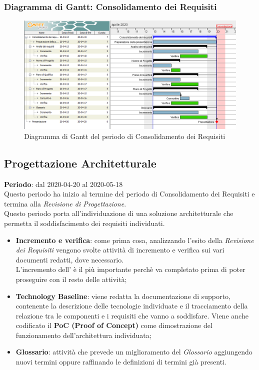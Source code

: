 	\subsubsection{Diagramma di Gantt: Consolidamento dei Requisiti}
		\begin{figure}[h]
			\centering
			\includegraphics[width=1.1\textwidth]{./res/img/DiagrammiGantt/cons_req_gantt.png}
			\caption{Diagramma di Gantt del periodo di Consolidamento dei Requisiti}
		\end{figure}
\newpage
\subsection{Progettazione Architetturale}
\textbf{Periodo}: dal 2020-04-20 al 2020-05-18 \\
Questo periodo ha inizio al termine del periodo di Consolidamento dei Requisiti e termina alla \textit{Revisione di Progettazione}. \\
Questo periodo porta all'individuazione di una soluzione architetturale che permetta il soddisfacimento dei requisiti individuati.
\begin{itemize}
	\item \textbf{Incremento e verifica}: come prima cosa, analizzando l'esito della \textit{Revisione dei Requisiti} vengono svolte attività di incremento e verifica sui vari documenti redatti, dove necessario. \\
	L'incremento dell'\textit{\AdR{}} è il più importante perchè va completato prima di poter proseguire con il resto delle attività;
	\item \textbf{Technology Baseline}: viene redatta la documentazione di supporto, contenente la descrizione delle tecnologie individuate e il tracciamento della relazione tra le componenti e i requisiti che vanno a soddisfare. Viene anche codificato il \textbf{PoC (Proof of Concept)} come dimostrazione del funzionamento dell'architettura individuata;
	\item \textbf{Glossario}: attività che prevede un miglioramento del \textit{Glossario} aggiungendo nuovi termini oppure raffinando le definizioni di termini già presenti.
\end{itemize}

